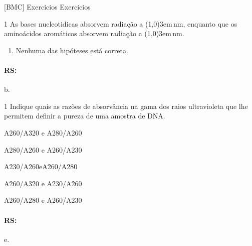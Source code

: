 \documentclass[\mainfilename]{subfiles}
\begin{document}
[BMC]
{Exercicios}
{Exercicios}


\begin{questionBox}1{ %
    As bases nucleotidicas absorvem radiação a \line(1,0){3em}\,\si{\nano\metre}, enquanto que os aminoácidos aromáticos absorvem radiação a \line(1,0){3em}\,\si{\nano\metre}.
} %
    
    \begin{enumerate}[label=\alph{enumi}.]
        \item Nenhuma das hipóteses está correta.
    \end{enumerate}

    \paragraph*{RS:} b.

\end{questionBox}

\begin{questionBox}1{ %
    Indique quais as razões de absorvância na gama dos raios ultravioleta que lhe permitem definir a pureza de uma amostra de DNA.
} %

    \begin{enumerate}[label=\alph{enumi}.]
        \begin{multicols}{2}
            \item A260/A320 e A280/A260 
            \item A280/A260 e A260/A230 
            \item A230/A260eA260/A280 
            \item A260/A320 e A230/A260 
            \item A260/A280 e A260/A230
        \end{multicols}
    \end{enumerate}

    \paragraph*{RS:} e.

\end{questionBox}
\end{document}

